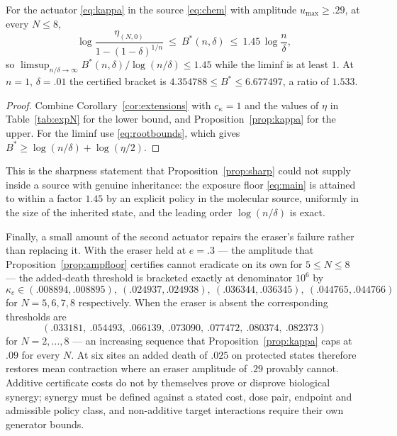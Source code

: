 \begin{corollary}\label{cor:sharpconst}
For the actuator \eqref{eq:kappa} in the source \eqref{eq:chem} with amplitude
$u_{\max}\ge.29$, at every $N\le8$,
\[
 \log\frac{\eta_{(N,0)}}{1-(1-\delta)^{1/n}}\ \le\ B^*(n,\delta)
 \ \le\ 1.45\,\log\frac n\delta ,
\]
so $\limsup_{n/\delta\to\infty}B^*(n,\delta)/\log(n/\delta)\le1.45$ while the
liminf is at least $1$. At $n=1$, $\delta=.01$ the certified bracket is
$4.354788\le B^*\le6.677497$, a ratio of $1.533$.
\end{corollary}

\begin{proof}
Combine Corollary~\ref{cor:extensions} with $c_\kappa=1$ and the values of
$\eta$ in Table~\ref{tab:expN} for the lower bound, and
Proposition~\ref{prop:kappa} for the upper. For the liminf use
\eqref{eq:rootbounds}, which gives
$B^*\ge\log(n/\delta)+\log(\eta/2)$.
\end{proof}

This is the sharpness statement that Proposition~\ref{prop:sharp} could not
supply inside a source with genuine inheritance: the exposure floor
\eqref{eq:main} is attained to within a factor $1.45$ by an explicit policy in
the molecular source, uniformly in the size of the inherited state, and the
leading order $\log(n/\delta)$ is exact.

Finally, a small amount of the second actuator repairs the eraser's failure
rather than replacing it. With the eraser held at $e=.3$ --- the amplitude that
Proposition~\ref{prop:ampfloor} certifies cannot eradicate on its own for
$5\le N\le8$ --- the added-death threshold is bracketed exactly at denominator
$10^6$ by
\[
 \kappa_c\in(.008894,.008895),\ (.024937,.024938),\ (.036344,.036345),\
 (.044765,.044766)
\]
for $N=5,6,7,8$ respectively. When the eraser is absent the corresponding
thresholds are
\[
 (.033181,\ .054493,\ .066139,\ .073090,\ .077472,\ .080374,\ .082373)
\]
for $N=2,\dots,8$ --- an increasing sequence that
Proposition~\ref{prop:kappa} caps at $.09$ for every $N$. At six sites an added
death of $.025$ on protected states therefore restores mean contraction where
an eraser amplitude of $.29$ provably cannot.
Additive certificate costs do not by themselves prove or disprove biological
synergy; synergy must be defined against a stated cost, dose pair, endpoint and
admissible policy class, and non-additive target interactions require their own
generator bounds.
